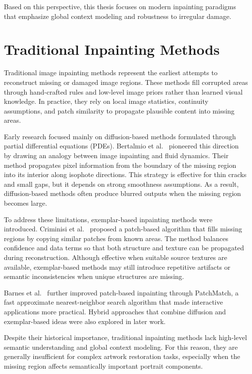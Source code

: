 \documentclass[12pt, twoside]{report}
\begin{document}
Based on this perspective, this thesis focuses on modern inpainting paradigms that emphasize global context modeling and robustness to irregular damage.

\section{Traditional Inpainting Methods}

Traditional image inpainting methods represent the earliest attempts to reconstruct missing or damaged image regions. These methods fill corrupted areas through hand-crafted rules and low-level image priors rather than learned visual knowledge. In practice, they rely on local image statistics, continuity assumptions, and patch similarity to propagate plausible content into missing areas.

Early research focused mainly on diffusion-based methods formulated through partial differential equations (PDEs). Bertalmio et al.~\cite{bertalmio2000inpainting} pioneered this direction by drawing an analogy between image inpainting and fluid dynamics. Their method propagates pixel information from the boundary of the missing region into its interior along isophote directions. This strategy is effective for thin cracks and small gaps, but it depends on strong smoothness assumptions. As a result, diffusion-based methods often produce blurred outputs when the missing region becomes large.

To address these limitations, exemplar-based inpainting methods were introduced. Criminisi et al.~\cite{criminisi2004exemplar} proposed a patch-based algorithm that fills missing regions by copying similar patches from known areas. The method balances confidence and data terms so that both structure and texture can be propagated during reconstruction. Although effective when suitable source textures are available, exemplar-based methods may still introduce repetitive artifacts or semantic inconsistencies when unique structures are missing.

Barnes et al.~\cite{barnes2009patchmatch} further improved patch-based inpainting through PatchMatch, a fast approximate nearest-neighbor search algorithm that made interactive applications more practical. Hybrid approaches that combine diffusion and exemplar-based ideas were also explored in later work.

Despite their historical importance, traditional inpainting methods lack high-level semantic understanding and global context modeling. For this reason, they are generally insufficient for complex artwork restoration tasks, especially when the missing region affects semantically important portrait components.
\end{document}
